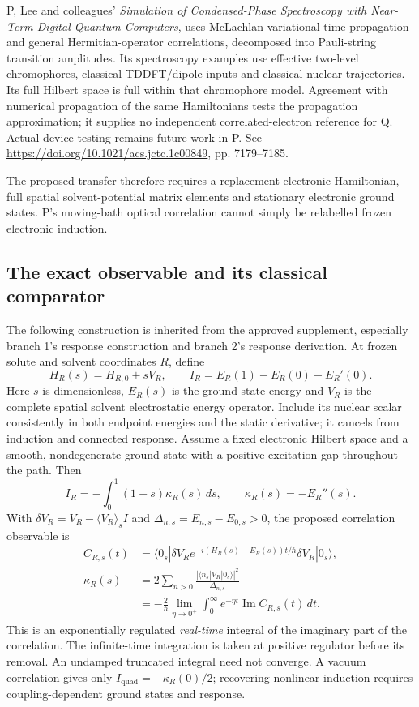 \documentclass{article}
\begin{document}
P, Lee and colleagues' \emph{Simulation of Condensed-Phase Spectroscopy with Near-Term Digital Quantum Computers}, uses McLachlan variational time propagation and general Hermitian-operator correlations, decomposed into Pauli-string transition amplitudes. Its spectroscopy examples use effective two-level chromophores, classical TDDFT/dipole inputs and classical nuclear trajectories. Its full Hilbert space is full within that chromophore model. Agreement with numerical propagation of the same Hamiltonians tests the propagation approximation; it supplies no independent correlated-electron reference for Q. Actual-device testing remains future work in P. See \url{https://doi.org/10.1021/acs.jctc.1c00849}, pp. 7179--7185.

The proposed transfer therefore requires a replacement electronic Hamiltonian, full spatial solvent-potential matrix elements and stationary electronic ground states. P's moving-bath optical correlation cannot simply be relabelled frozen electronic induction.

\subsection{The exact observable and its classical comparator}

The following construction is inherited from the approved supplement, especially branch 1's response construction and branch 2's response derivation. At frozen solute and solvent coordinates $R$, define
\begin{equation*}
H_R(s)=H_{R,0}+sV_R,\qquad I_R=E_R(1)-E_R(0)-E_R'(0).
\end{equation*}
Here $s$ is dimensionless, $E_R(s)$ is the ground-state energy and $V_R$ is the complete spatial solvent electrostatic energy operator. Include its nuclear scalar consistently in both endpoint energies and the static derivative; it cancels from induction and connected response. Assume a fixed electronic Hilbert space and a smooth, nondegenerate ground state with a positive excitation gap throughout the path. Then
\begin{equation*}
I_R=-\int_0^1(1-s)\kappa_R(s)\,ds,\qquad \kappa_R(s)=-E_R''(s).
\end{equation*}
With $\delta V_R=V_R-\langle V_R\rangle_s I$ and $\Delta_{n,s}=E_{n,s}-E_{0,s}>0$, the proposed correlation observable is
\begin{align*}
C_{R,s}(t)&=\langle0_s|\delta V_R e^{-i(H_R(s)-E_R(s))t/\hbar}\delta V_R|0_s\rangle,\\
\kappa_R(s)&=2\sum_{n>0}\frac{|\langle n_s|V_R|0_s\rangle|^2}{\Delta_{n,s}}\\
&=-\frac{2}{\hbar}\lim_{\eta\to0^+}\int_0^\infty e^{-\eta t}\operatorname{Im}C_{R,s}(t)\,dt.
\end{align*}
This is an exponentially regulated \emph{real-time} integral of the imaginary part of the correlation. The infinite-time integration is taken at positive regulator before its removal. An undamped truncated integral need not converge. A vacuum correlation gives only $I_{\mathrm{quad}}=-\kappa_R(0)/2$; recovering nonlinear induction requires coupling-dependent ground states and response.
\end{document}
